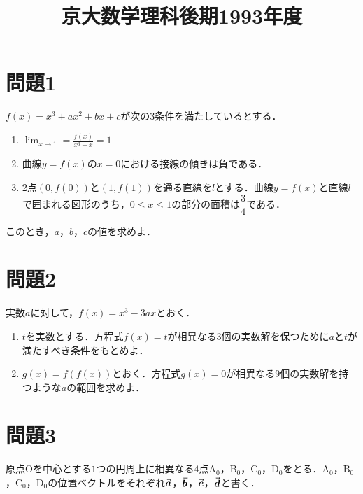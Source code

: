 \documentclass[unicode,12pt, A4j]{ltjsarticle}%
\title{京大数学理科後期1993年度}
\author{}
\date{}
\begin{document}
\maketitle

\section{問題1}
$f(x)=x^3+ax^2+bx+c$が次の3条件を満たしているとする．
\begin{enumerate}
 \item ${\displaystyle \lim_{x\to 1}=\frac{f(x)}{x^3-x}= 1}$
 \item 曲線$y=f(x)$の$x=0$における接線の傾きは負である．
 \item 2点$(0,f(0))$と$(1,f(1))$を通る直線を$l$とする．曲線$y=f(x)$と直線$l$で囲まれる図形のうち，$0\le x\le 1$の部分の面積は$\dfrac{3}{4}$である．
\end{enumerate}
このとき，$a$，$b$，$c$の値を求めよ．


\section{問題2}
実数$a$に対して，$f(x)=x^3-3ax$とおく．
\begin{enumerate}
 \item $t$を実数とする．方程式$f(x)=t$が相異なる$3$個の実数解を保つために$a$と$t$が満たすべき条件をもとめよ．
 \item $g(x)=f(f(x))$とおく．方程式$g(x)=0$が相異なる$9$個の実数解を持つような$a$の範囲を求めよ．
\end{enumerate}

\section{問題3}
原点$\mathrm{O}$を中心とする$1$つの円周上に相異なる$4$点$\mathrm{A}_0$，$\mathrm{B}_0$，$\mathrm{C}_0$，$\mathrm{D}_0$をとる．$\mathrm{A}_0$，$\mathrm{B}_0$，$\mathrm{C}_0$，$\mathrm{D}_0$の位置ベクトルをそれぞれ$\va*{a}$，$\va*{b}$，$\va*{c}$，$\va*{d}$と書く．
\end{document}
